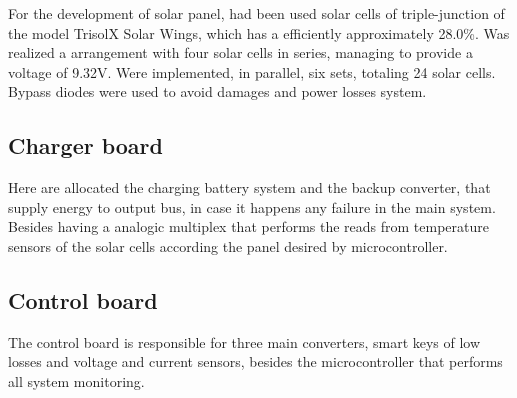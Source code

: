 \documentclass[3p]{elsarticle}
\begin{document}
	For the development of solar panel, had been used solar cells of triple-junction of the model TrisolX Solar Wings, which has a efficiently approximately 28.0\%. Was realized a arrangement with four solar cells in series, managing to provide a voltage of 9.32V. Were implemented, in parallel, six sets, totaling 24 solar cells. Bypass diodes were used to avoid damages and power losses system.%
		
\subsection{\textbf{Charger board}}
\label{Charger board}

	Here are allocated the charging battery system and the backup converter, that supply energy to output bus, in case it happens any failure in the main system. Besides having a analogic multiplex that performs the reads from temperature sensors of the solar cells according the panel desired by microcontroller.%

\subsection{\textbf{Control board}}
\label{Control board}

	The control board is responsible for three main converters, smart keys of low losses and voltage and current sensors, besides the microcontroller that performs all system monitoring.%
	
\end{document}
